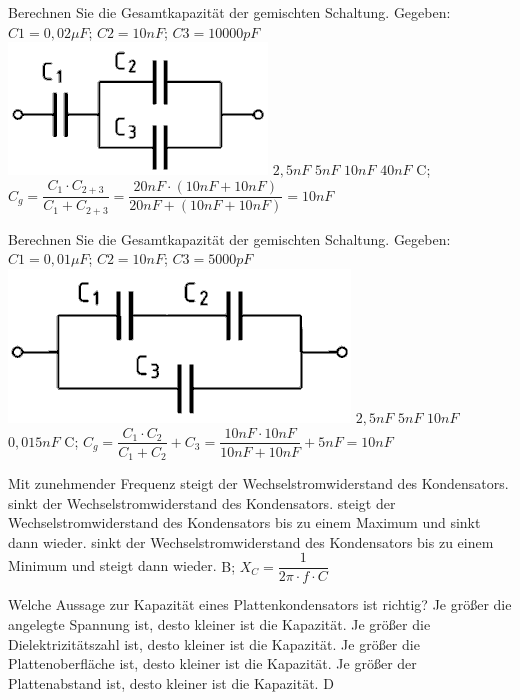 {
Berechnen Sie die Gesamtkapazität der gemischten Schaltung. Gegeben: $C1 = 0,02\mu F$; $C2 = 10nF$; $C3 = 10000pF $ \\
\includegraphics[scale=0.35]{Kondensator/Bilder/TD106.png}
}%
{$2,5nF$}%
{$5nF$}%
{$10nF$}%
{$40nF$}%
{C; $C_g = \dfrac{C_1 \cdot C_{2+3}}{C_1 + C_{2+3}} = \dfrac{20nF \cdot (10nF + 10nF)}{20nF + (10nF + 10nF)} = 10nF$}%

{
Berechnen Sie die Gesamtkapazität der gemischten Schaltung. Gegeben: $C1 = 0,01 \mu F$; $C2 = 10 nF$; $C3 = 5000 pF$\\
\includegraphics[scale=0.3]{Kondensator/Bilder/TD107.png}
}%
{$2,5 nF$}%
{$5 nF$}%
{$10 nF$}%
{$0,015 nF$}%
{C; $C_g = \dfrac{C_1 \cdot C_2}{C_1 + C_2} + C_3 = \dfrac{10nF \cdot 10nF}{10nF + 10nF} + 5nF = 10nF$}%

{Mit zunehmender Frequenz}%
{steigt der Wechselstromwiderstand des Kondensators.}%
{sinkt der Wechselstromwiderstand des Kondensators.}%
{steigt der Wechselstromwiderstand des Kondensators bis zu einem Maximum und sinkt dann wieder.}%
{sinkt der Wechselstromwiderstand des Kondensators bis zu einem Minimum und steigt dann wieder.}%
{B; $X_C = \dfrac{1}{2\pi \cdot f \cdot C}$}%


{Welche Aussage zur Kapazität eines Plattenkondensators ist richtig?}%
{Je größer die angelegte Spannung ist, desto kleiner ist die Kapazität.}%
{Je größer die Dielektrizitätszahl ist, desto kleiner ist die Kapazität.}%
{Je größer die Plattenoberfläche ist, desto kleiner ist die Kapazität.}%
{Je größer der Plattenabstand ist, desto kleiner ist die Kapazität.}%
{D}%

